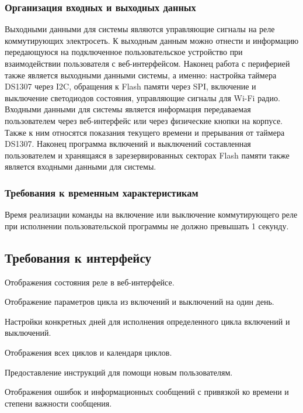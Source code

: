 \subsubsection{Организация входных и выходных данных}
Выходными данными для системы являются управляющие сигналы на реле коммутирующих электросеть. К выходным данным можно отнести и информацию передающуюся на подключенное пользовательское устройство при взаимодействии пользователя с веб-интерфейсом. Наконец работа с периферией также является выходными данными системы, а именно: настройка таймера DS1307 через I2C, обращения к Flash памяти через SPI, включение и выключение светодиодов состояния, управляющие сигналы для Wi-Fi радио. Входными данными для системы является информация передаваемая пользователем через веб-интерфейс или через физические кнопки на корпусе. Также к ним относятся показания текущего времени и прерывания от таймера DS1307. Наконец программа включений и выключений составленная пользователем и хранящаяся в зарезервированных секторах Flash памяти также является входными данными для системы.

\subsubsection{Требования к временным характеристикам}
Время реализации команды на включение или выключение коммутирующего реле при исполнении пользовательской программы не должно превышать 1 секунду.



\subsection{Требования к интерфейсу}
\begin{my_enumerate}
\item Отображения состояния реле в веб-интерфейсе.
\item Отображение параметров цикла из включений и выключений на один день.
\item Настройки конкретных дней для исполнения определенного цикла включений и выключений.
\item Отображения всех циклов и календаря циклов.
\item Предоставление инструкций для помощи новым пользователям.
\item Отображения ошибок и информационных сообщений с привязкой ко времени и степени важности сообщения.
\end{my_enumerate}


